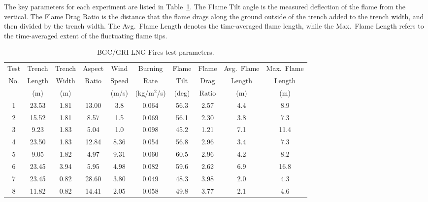 The key parameters for each experiment are listed in Table~\ref{BGC_sum}. The Flame Tilt angle is the measured deflection of the flame from the vertical. The Flame Drag Ratio is the distance that the flame drags along the ground outside of the trench added to the trench width, and then divided by the trench width. The Avg.~Flame Length denotes the time-averaged flame length, while the Max.~Flame Length refers to the time-averaged extent of the fluctuating flame tips.

\begin{table}[!ht]
\centering
\caption[BGC/GRI LNG Fires test parameters]{BGC/GRI LNG Fires test parameters.}
\label{BGC_sum}
\begin{tabular}{|c|c|c|c|c|c|c|c|c|c|}
\hline
Test  & Trench     & Trench    & Aspect  & Wind        & Burning           & Flame       & Flame       & Avg.~Flame  & Max.~Flame  \\
No.   & Length     & Width     & Ratio   & Speed       & Rate              & Tilt        & Drag        & Length      & Length      \\ 
      &        (m) &       (m) &         & (m/s)       & (kg/m$^2$/s)      & (deg)       & Ratio       &        (m)  &        (m)  \\ \hline
1     & 23.53      & 1.81      & 13.00   & 3.8         & 0.064             & 56.3        & 2.57        & 4.4         & 8.9         \\ \hline
2     & 15.52      & 1.81      & 8.57    & 1.5         & 0.069             & 56.1        & 2.30        & 3.8         & 7.3         \\ \hline
3     & 9.23       & 1.83      & 5.04    & 1.0         & 0.098             & 45.2        & 1.21        & 7.1         & 11.4        \\ \hline
4     & 23.50      & 1.83      & 12.84   & 8.36        & 0.054             & 56.8        & 2.96        & 3.4         & 7.3         \\ \hline
5     & 9.05       & 1.82      & 4.97    & 9.31        & 0.060             & 60.5        & 2.96        & 4.2         & 8.2         \\ \hline
6     & 23.45      & 3.94      & 5.95    & 4.98        & 0.082             & 59.6        & 2.62        & 6.9         & 16.8        \\ \hline
7     & 23.45      & 0.82      & 28.60   & 3.80        & 0.049             & 48.3        & 3.98        & 2.0         & 4.3         \\ \hline
8     & 11.82      & 0.82      & 14.41   & 2.05        & 0.058             & 49.8        & 3.77        & 2.1         & 4.6         \\ \hline

\end{tabular}
\end{table}
